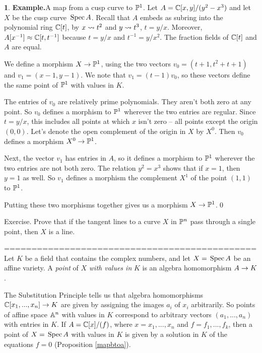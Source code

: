 \documentclass[leqno]{book}
\newcommand\Marginnote[1]{\marginnote{\hspace{-12pt}\normalfont{#1}}}
\theoremstyle{definition}%
\numberwithin{equation}{section}
\newtheorem{example}[equation]{}
\theoremstyle{theorem} %
\begin{document}
\msno 
\begin{example}{\bf Example.}\Marginnote{maptoP}\label{maptoP}
 A map from a cusp curve to
$\mathbb{P}^1$.  Let $A = \mathbb{C}[x,y]/(y^2-x^3)$ and let $X$ be the cusp curve
 $\,\operatorname{Spec} A$.  Recall that $A$
 embeds as subring into the polynomial ring $\mathbb{C}[t]$, by $x
\rightsquigarrow t^2$ and $y\rightsquigarrow t^3$, $t = y/x$.  Moreover, $A[x^{-1}]
\approx\mathbb{C}[t,t^{-1}]$ because $t = y/x$ and $t^{-1} = y/x^2$.
The fraction fields of $\mathbb{C}[t]$ and $A$ are equal.

We define a morphism $X \rightarrow \mathbb{P}^1$, using the two vectors
$v_0=(t+1,t^2+t+1)$ and $v_1=(x-1,y-1).$ We note that $v_1 =
(t-1)v_0$, so these vectors  define
the same point of $\mathbb{P}^1$ with values in $K$.

The entries of $v_0$ are relatively prime polynomials.  They aren't
both zero at any point.  So $v_0$ defines a morphism to $\mathbb{P}^1$
wherever the two entries are regular.  Since $t = y/x$, this includes
all points at which $x$ isn't zero -- all points except the origin
$(0,0)$.  Let's denote the open complement of the origin in $X$ by
$X^0$.  Then $v_0$ defines a morphism $X^0\rightarrow \mathbb{P}^1$.  

Next, the vector $v_1$ has entries in $A$, so it defines a morphism to
$\mathbb{P}^1$ wherever the two entries are not both zero.  The relation
$y^2=x^3$ shows that if $x=1$, then $y=1$ as well.  So $v_1$
defines a morphism the complement $X^1$ of
the point $(1,1)$ to $\mathbb{P}^1$.  

Putting these two morphisms together gives us a morphism $X \rightarrow
\mathbb{P}^1$.\qed\end{example}

Exercise.  Prove that if the tangent lines to a curve $X$ in $\mathbb{P}^n$
pass through a single point, then $X$ is a line.


==============================================
\ms Let $K$ be a field that contains the complex numbers, and let $X =
\,\operatorname{Spec} A$ be an affine variety.  A {\it point} of $X$ {\it with values
  in} $K$ is an algebra homomorphism $A \rightarrow K$.

\ms The Substitution Principle tells us that algebra homomorphisms
$\mathbb{C}[x_1,...,x_n] \rightarrow K$ are given by assigning the images $a_i$ of
$x_i$ arbitrarily.  So points of affine space $\mathbb{A}^n$ with values in
$K$ correspond to arbitrary vectors $(a_1,...,a_n)$ with entries in
$K$.  If $A = \mathbb{C}[x]/(f)$, where $x=x_1,...,x_n$ and $f =
f_1,...,f_k$, then a point of $X= \,\operatorname{Spec} A$ with values in $K$ is given
by a solution in $K$ of the equations $f=0$ (Proposition
\ref{mapbtoa}). 
\end{document}
